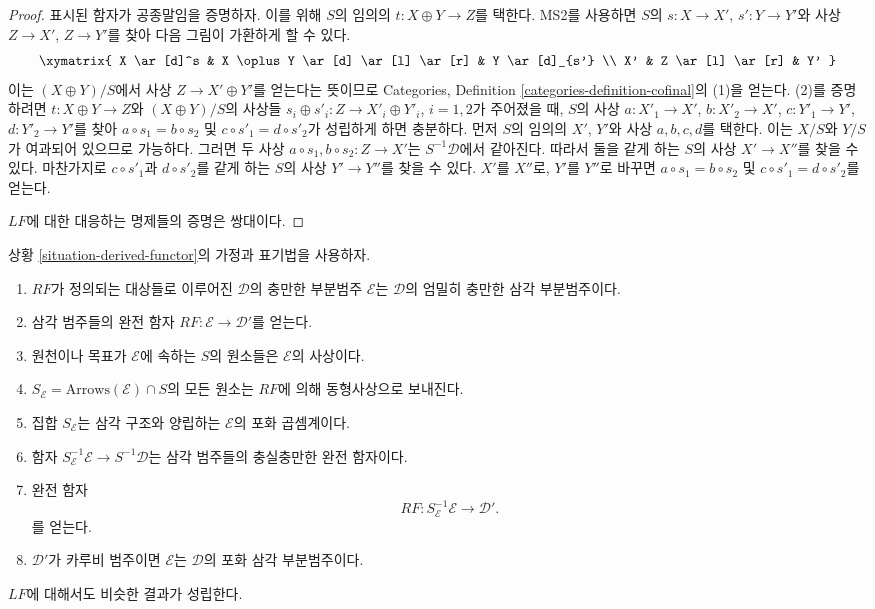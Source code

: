 \begin{proof}
\medskip\noindent
표시된 함자가 공종말임을 증명하자. 이를 위해 $S$의 임의의
$t : X \oplus Y \to Z$를 택한다. MS2를 사용하면 $S$의
$s : X \to X'$, $s' : Y \to Y'$와 사상 $Z \to X'$, $Z \to Y'$를
찾아 다음 그림이 가환하게 할 수 있다.
$$
\xymatrix{
X \ar[d]^s & X \oplus Y \ar[d] \ar[l] \ar[r] & Y \ar[d]_{s'} \\
X' & Z \ar[l] \ar[r] & Y'
}
$$
이는 $(X \oplus Y)/S$에서 사상 $Z \to X' \oplus Y'$를 얻는다는
뜻이므로 Categories, Definition \ref{categories-definition-cofinal}의
(1)을 얻는다. (2)를 증명하려면 $t : X \oplus Y \to Z$와
$(X \oplus Y)/S$의 사상들
$s_i \oplus s'_i : Z \to X'_i \oplus Y'_i$, $i = 1, 2$가 주어졌을 때,
$S$의 사상 $a : X'_1 \to X'$, $b : X'_2 \to X'$,
$c : Y'_1 \to Y'$, $d : Y'_2 \to Y'$를 찾아
$a \circ s_1 = b \circ s_2$ 및 $c \circ s'_1 = d \circ s'_2$가
성립하게 하면 충분하다. 먼저 $S$의 임의의 $X'$, $Y'$와 사상
$a, b, c, d$를 택한다. 이는 $X/S$와 $Y/S$가 여과되어 있으므로
가능하다. 그러면 두 사상 $a \circ s_1, b \circ s_2 : Z \to X'$는
$S^{-1}\mathcal{D}$에서 같아진다. 따라서 둘을 같게 하는 $S$의 사상
$X' \to X''$를 찾을 수 있다. 마찬가지로 $c \circ s'_1$과
$d \circ s'_2$를 같게 하는 $S$의 사상 $Y' \to Y''$를 찾을 수 있다.
$X'$를 $X''$로, $Y'$를 $Y''$로 바꾸면
$a \circ s_1 = b \circ s_2$ 및 $c \circ s'_1 = d \circ s'_2$를 얻는다.

\medskip\noindent
$LF$에 대한 대응하는 명제들의 증명은 쌍대이다.
\end{proof}

\begin{proposition}
\label{proposition-derived-functor}
상황 \ref{situation-derived-functor}의 가정과 표기법을 사용하자.
\begin{enumerate}
\item $RF$가 정의되는 대상들로 이루어진 $\mathcal{D}$의 충만한 부분범주
$\mathcal{E}$는 $\mathcal{D}$의 엄밀히 충만한 삼각 부분범주이다.
\item 삼각 범주들의 완전 함자
$RF : \mathcal{E} \longrightarrow \mathcal{D}'$를 얻는다.
\item 원천이나 목표가 $\mathcal{E}$에 속하는 $S$의 원소들은
$\mathcal{E}$의 사상이다.
\item $S_\mathcal{E} = \text{Arrows}(\mathcal{E}) \cap S$의 모든 원소는
$RF$에 의해 동형사상으로 보내진다.
\item 집합 $S_\mathcal{E}$는 삼각 구조와 양립하는 $\mathcal{E}$의 포화
곱셈계이다.
\item 함자 $S_\mathcal{E}^{-1}\mathcal{E} \to S^{-1}\mathcal{D}$는
삼각 범주들의 충실충만한 완전 함자이다.
\item 완전 함자
$$
RF : S_\mathcal{E}^{-1}\mathcal{E} \longrightarrow \mathcal{D}'.
$$
를 얻는다.
\item $\mathcal{D}'$가 카루비 범주이면 $\mathcal{E}$는
$\mathcal{D}$의 포화 삼각 부분범주이다.
\end{enumerate}
$LF$에 대해서도 비슷한 결과가 성립한다.
\end{proposition}

